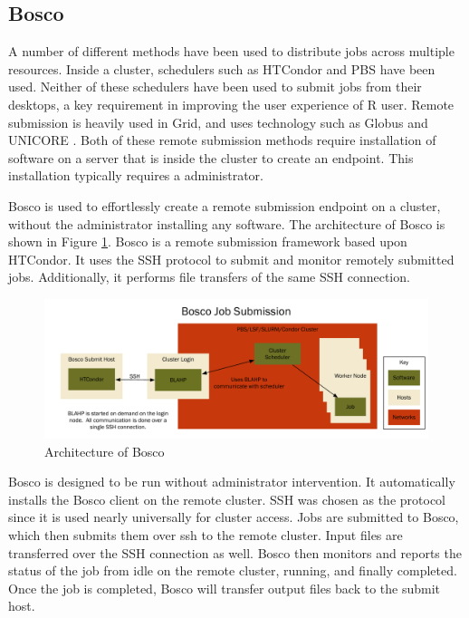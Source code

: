 \documentclass[conference]{IEEEtran}
\begin{document}
\subsection{Bosco}
A number of different methods have been used to distribute jobs across multiple resources.  Inside a cluster, schedulers such as HTCondor  \cite{litzkow1988condor} and PBS \cite{henderson1995job} have been used.  Neither of these schedulers have been used to submit jobs from their desktops, a key requirement in improving the user experience of R user.  Remote submission is heavily used in Grid, and uses technology such as Globus \cite{foster2001globus} and UNICORE \cite{romberg2002unicore}.  Both of these remote submission methods require installation of software on a server that is inside the cluster to create an endpoint.  This installation typically requires a administrator.

Bosco \cite{weitzel2014accessing} is used to effortlessly create a remote submission endpoint on a cluster, without the administrator installing any software.  The architecture of Bosco is shown in Figure \ref{fig:boscoarch}.  Bosco is a remote submission framework based upon HTCondor.  It uses the SSH \cite{ylonen2006secure} protocol to submit and monitor remotely submitted jobs.  Additionally, it performs file transfers of the same SSH connection.

\begin{figure}[ht]
\centering
\includegraphics[width=.8\textwidth]{images/ArchitectureGraph1.pdf}
\caption{Architecture of Bosco}
\label{fig:boscoarch}
\end{figure}

Bosco is designed to be run without administrator intervention.  It automatically installs the Bosco client on the remote cluster.  SSH was chosen as the protocol since it is used nearly universally for cluster access.  Jobs are submitted to Bosco, which then submits them over ssh to the remote cluster.  Input files are transferred over the SSH connection as well.  Bosco then monitors and reports the status of the job from idle on the remote cluster, running, and finally completed.  Once the job is completed, Bosco will transfer output files back to the submit host.
\end{document}
